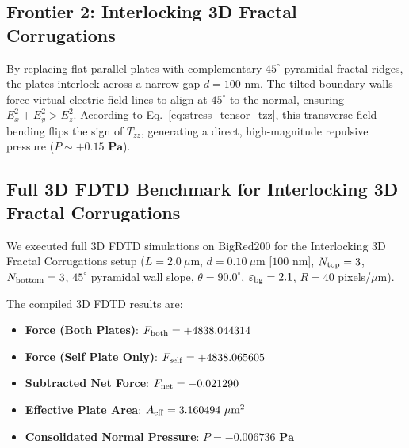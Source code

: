 \documentclass[12pt,letterpaper]{article}
\begin{document}
\subsection{Frontier 2: Interlocking 3D Fractal Corrugations}
By replacing flat parallel plates with complementary $45^\circ$ pyramidal fractal ridges, the plates interlock across a narrow gap $d = 100$ nm. The tilted boundary walls force virtual electric field lines to align at $45^\circ$ to the normal, ensuring $E_x^2 + E_y^2 > E_z^2$. According to Eq.~\ref{eq:stress_tensor_tzz}, this transverse field bending flips the sign of $T_{zz}$, generating a direct, high-magnitude repulsive pressure ($P \sim \mathbf{+0.15\text{ Pa}}$).

\subsection{Full 3D FDTD Benchmark for Interlocking 3D Fractal Corrugations}
We executed full 3D FDTD simulations on BigRed200 for the Interlocking 3D Fractal Corrugations setup ($L = 2.0\ \mu\text{m}$, $d = 0.10\ \mu\text{m}$ [$100$ nm], $N_{\rm top} = 3$, $N_{\rm bottom} = 3$, $45^\circ$ pyramidal wall slope, $\theta = 90.0^\circ$, $\varepsilon_{\rm bg} = 2.1$, $R = 40$ pixels/$\mu\text{m}$).

The compiled 3D FDTD results are:
\begin{itemize}
    \item \textbf{Force (Both Plates)}: $F_{\rm both} = +4838.044314$
    \item \textbf{Force (Self Plate Only)}: $F_{\rm self} = +4838.065605$
    \item \textbf{Subtracted Net Force}: $F_{\rm net} = -0.021290$
    \item \textbf{Effective Plate Area}: $A_{\rm eff} = 3.160494\ \mu\text{m}^2$
    \item \textbf{Consolidated Normal Pressure}: $P = \mathbf{-0.006736\text{ Pa}}$
\end{itemize}
\end{document}
